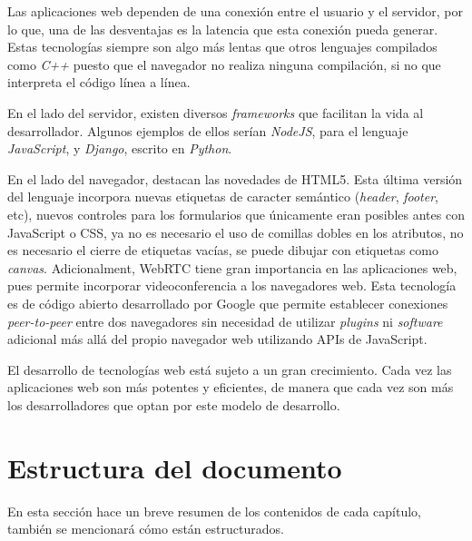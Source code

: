 \documentclass[a4paper, 12pt]{book}
\begin{document}
Las aplicaciones web dependen de una conexión entre el usuario y el servidor, por lo que, una de las desventajas es la latencia que esta conexión pueda generar. Estas tecnologías siempre son algo más lentas que otros lenguajes compilados como \emph{C++} puesto que el navegador no realiza ninguna compilación, si no que interpreta el código línea a línea.

En el lado del servidor, existen diversos \emph{frameworks} que facilitan la vida al desarrollador. Algunos ejemplos de ellos serían \emph{NodeJS}, para el lenguaje \emph{JavaScript}, y \emph{Django}, escrito en \emph{Python}.

En el lado del navegador, destacan las novedades de HTML5. Esta última versión del lenguaje incorpora nuevas etiquetas de caracter semántico (\emph{header}, \emph{footer}, etc), nuevos controles para los formularios que únicamente eran posibles antes con JavaScript o CSS, ya no es necesario el uso de comillas dobles en los atributos, no es necesario el cierre de etiquetas vacías, se puede dibujar con etiquetas como \emph{canvas}. Adicionalment, WebRTC tiene gran importancia en las aplicaciones web, pues permite incorporar videoconferencia a los navegadores web. Esta tecnología es de código abierto desarrollado por Google que permite establecer conexiones \emph{peer-to-peer} entre dos navegadores sin necesidad de utilizar \emph{plugins} ni \emph{software} adicional más allá del propio navegador web utilizando APIs de JavaScript.

El desarrollo de tecnologías web está sujeto a un gran crecimiento. Cada vez las aplicaciones web son más potentes y eficientes, de manera que cada vez son más los desarrolladores que optan por este modelo de desarrollo.


\section{Estructura del documento}

En esta sección hace un breve resumen de los contenidos de cada capítulo, también se mencionará cómo están estructurados.
\end{document}
